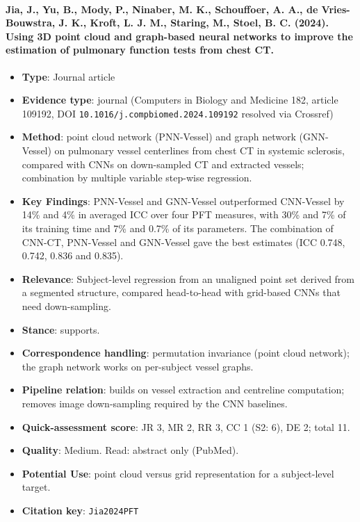 \documentclass[journal,onecolumn]{IEEEtran}
\begin{document}
\paragraph{Jia, J., Yu, B., Mody, P., Ninaber, M. K., Schouffoer, A. A., de Vries-Bouwstra, J. K., Kroft, L. J. M., Staring, M., Stoel, B. C. (2024). Using 3D point cloud and graph-based neural networks to improve the estimation of pulmonary function tests from chest CT.~\cite{Jia2024PFT}}\mbox{}

\begin{itemize}

\item{} \textbf{Type}: Journal article

\item{} \textbf{Evidence type}: journal (Computers in Biology and Medicine 182, article 109192, DOI \nolinkurl{10.1016/j.compbiomed.2024.109192} resolved via Crossref)

\item{} \textbf{Method}: point cloud network (PNN-Vessel) and graph network (GNN-Vessel) on pulmonary vessel centerlines from chest CT in systemic sclerosis, compared with CNNs on down-sampled CT and extracted vessels; combination by multiple variable step-wise regression.

\item{} \textbf{Key Findings}: PNN-Vessel and GNN-Vessel outperformed CNN-Vessel by 14\% and 4\% in averaged ICC over four PFT measures, with 30\% and 7\% of its training time and 7\% and 0.7\% of its parameters. The combination of CNN-CT, PNN-Vessel and GNN-Vessel gave the best estimates (ICC 0.748, 0.742, 0.836 and 0.835).

\item{} \textbf{Relevance}: Subject-level regression from an unaligned point set derived from a segmented structure, compared head-to-head with grid-based CNNs that need down-sampling.

\item{} \textbf{Stance}: supports.

\item{} \textbf{Correspondence handling}: permutation invariance (point cloud network); the graph network works on per-subject vessel graphs.

\item{} \textbf{Pipeline relation}: builds on vessel extraction and centreline computation; removes image down-sampling required by the CNN baselines.

\item{} \textbf{Quick-assessment score}: JR 3, MR 2, RR 3, CC 1 (S2: 6), DE 2; total 11.

\item{} \textbf{Quality}: Medium. Read: abstract only (PubMed).

\item{} \textbf{Potential Use}: point cloud versus grid representation for a subject-level target.

\item{} \textbf{Citation key}: \texttt{Jia2024PFT}

\end{itemize}
\end{document}
